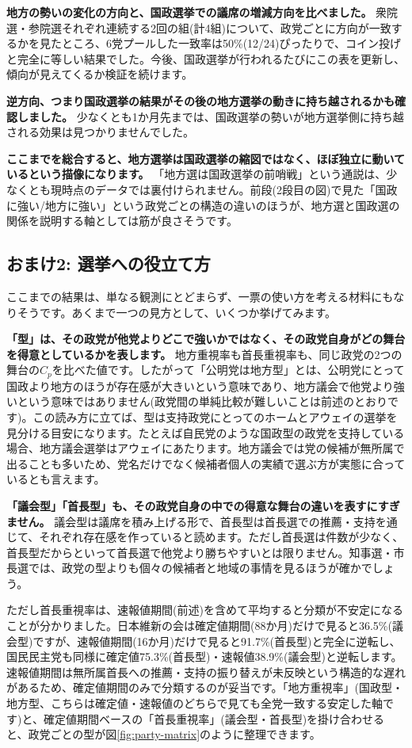 \documentclass[a4paper,11pt]{ltjsarticle}
\begin{document}
\textbf{地方の勢いの変化の方向と、国政選挙での議席の増減方向を比べました。} 衆院選・参院選それぞれ連続する2回の組(計4組)について、政党ごとに方向が一致するかを見たところ、6党プールした一致率は50\%(12/24)ぴったりで、コイン投げと完全に等しい結果でした。今後、国政選挙が行われるたびにこの表を更新し、傾向が見えてくるか検証を続けます。

\textbf{逆方向、つまり国政選挙の結果がその後の地方選挙の動きに持ち越されるかも確認しました。} 少なくとも1か月先までは、国政選挙の勢いが地方選挙側に持ち越される効果は見つかりませんでした。

\textbf{ここまでを総合すると、地方選挙は国政選挙の縮図ではなく、ほぼ独立に動いているという描像になります。} 「地方選は国政選挙の前哨戦」という通説は、少なくとも現時点のデータでは裏付けられません。前段(2段目の図)で見た「国政に強い/地方に強い」という政党ごとの構造の違いのほうが、地方選と国政選の関係を説明する軸としては筋が良さそうです。

\subsection*{おまけ2: 選挙への役立て方}

ここまでの結果は、単なる観測にとどまらず、一票の使い方を考える材料にもなりそうです。あくまで一つの見方として、いくつか挙げてみます。

\textbf{「型」は、その政党が他党よりどこで強いかではなく、その政党自身がどの舞台を得意としているかを表します。} 地方重視率も首長重視率も、同じ政党の2つの舞台の$C_p$を比べた値です。したがって「公明党は地方型」とは、公明党にとって国政より地方のほうが存在感が大きいという意味であり、地方議会で他党より強いという意味ではありません(政党間の単純比較が難しいことは前述のとおりです)。この読み方に立てば、型は支持政党にとってのホームとアウェイの選挙を見分ける目安になります。たとえば自民党のような国政型の政党を支持している場合、地方議会選挙はアウェイにあたります。地方議会では党の候補が無所属で出ることも多いため、党名だけでなく候補者個人の実績で選ぶ方が実態に合っているとも言えます。

\textbf{「議会型」「首長型」も、その政党自身の中での得意な舞台の違いを表すにすぎません。} 議会型は議席を積み上げる形で、首長型は首長選での推薦・支持を通じて、それぞれ存在感を作っていると読めます。ただし首長選は件数が少なく、首長型だからといって首長選で他党より勝ちやすいとは限りません。知事選・市長選では、政党の型よりも個々の候補者と地域の事情を見るほうが確かでしょう。

ただし首長重視率は、速報値期間(前述)を含めて平均すると分類が不安定になることが分かりました。日本維新の会は確定値期間(88か月)だけで見ると36.5\%(議会型)ですが、速報値期間(16か月)だけで見ると91.7\%(首長型)と完全に逆転し、国民民主党も同様に確定値75.3\%(首長型)・速報値38.9\%(議会型)と逆転します。速報値期間は無所属首長への推薦・支持の振り替えが未反映という構造的な遅れがあるため、確定値期間のみで分類するのが妥当です。「地方重視率」(国政型・地方型、こちらは確定値・速報値のどちらで見ても全党一致する安定した軸です)と、確定値期間ベースの「首長重視率」(議会型・首長型)を掛け合わせると、政党ごとの型が図\ref{fig:party-matrix}のように整理できます。
\end{document}
